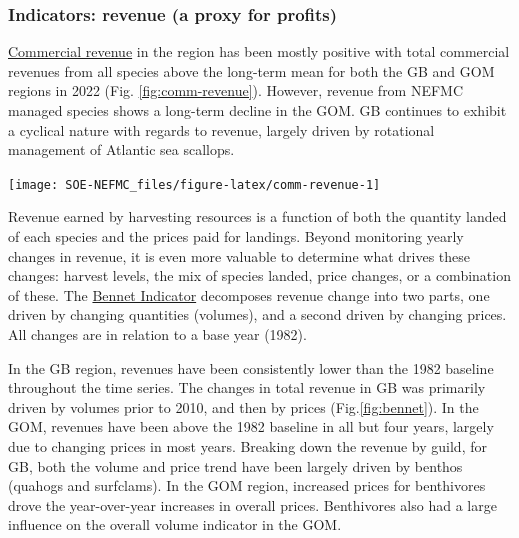 \documentclass[
  10pt,
]{article}
\let\origfigure\figure
\let\endorigfigure\endfigure
\renewenvironment{figure}[1][2] {
    \expandafter\origfigure\expandafter[H]
} {
    \endorigfigure
}
\begin{document}
\hypertarget{indicators-revenue-a-proxy-for-profits}{%
\subsubsection{Indicators: revenue (a proxy for profits)}\label{indicators-revenue-a-proxy-for-profits}}

\href{https://noaa-edab.github.io/catalog/commercial-landings-and-revenue.html}{Commercial revenue} in the region has been mostly positive with total commercial revenues from all species above the long-term mean for both the GB and GOM regions in 2022 (Fig. \ref{fig:comm-revenue}). However, revenue from NEFMC managed species shows a long-term decline in the GOM. GB continues to exhibit a cyclical nature with regards to revenue, largely driven by rotational management of Atlantic sea scallops.

\begin{figure}

{\centering \texttt{[image: SOE-NEFMC\_files/figure-latex/comm-revenue-1]} 

}

\caption{Revenue through 2022 for the New England region: total (black) and from NEFMC managed species (red).}\label{fig:comm-revenue}
\end{figure}

Revenue earned by harvesting resources is a function of both the quantity landed of each species and the prices paid for landings. Beyond monitoring yearly changes in revenue, it is even more valuable to determine what drives these changes: harvest levels, the mix of species landed, price changes, or a combination of these. The \href{https://noaa-edab.github.io/catalog/bennet-indicator.html}{Bennet Indicator} decomposes revenue change into two parts, one driven by changing quantities (volumes), and a second driven by changing prices. All changes are in relation to a base year (1982).

In the GB region, revenues have been consistently lower than the 1982 baseline throughout the time series. The changes in total revenue in GB was primarily driven by volumes prior to 2010, and then by prices (Fig.\ref{fig:bennet}). In the GOM, revenues have been above the 1982 baseline in all but four years, largely due to changing prices in most years. Breaking down the revenue by guild, for GB, both the volume and price trend have been largely driven by benthos (quahogs and surfclams). In the GOM region, increased prices for benthivores drove the year-over-year increases in overall prices. Benthivores also had a large influence on the overall volume indicator in the GOM.
\end{document}
